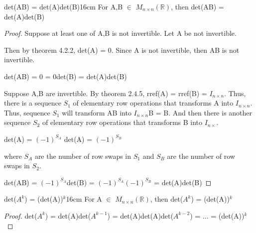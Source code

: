     \vspace{0.5cm}



    \begin{wtheorem}{det(AB) = det(A)det(B)}{16cm}
        For A,B $\in$ $M_{n \times n}(\mathbb{R})$, then
        det(AB) = det(A)det(B)
    \end{wtheorem}

    \begin{proof}
        Suppose at least one of A,B is not invertible.
        Let A be not invertible.

        Then by {\color{red} theorem 4.2.2}, det(A) = 0.
        Since A is not invertible, then AB is not invertible.

        \hspace{0.5cm}
        det(AB) = 0 = 0det(B) = det(A)det(B)

        Suppose A,B are invertible. By {\color{red} theorem 2.4.5},
        rref(A) = rref(B) = $I_{n \times n}$.
        Thus, there is a sequence $S_1$ of elementary row operations
        that transforms A into $I_{n \times n}$.
        Thus, sequence $S_1$ will transform AB into $I_{n \times n}$B = B.
        And then there is another sequence $S_2$
        of elementary row operations that transforms B into $I_{n \times}$.
    
        \hspace{0.5cm}
        det(A) = $(-1)^{S_A}$
        \hspace{1cm}
        det(A) = $(-1)^{S_B}$

        where $S_A$ are the number of row swaps in $S_1$
        and $S_B$ are the number of row swaps in $S_2$.

        \hspace{0.5cm}
        det(AB)
        = $(-1)^{S_A}$det(B)
        = $(-1)^{S_A} (-1)^{S_B}$
        = det(A)det(B)
    \end{proof}

    \vspace{0.5cm}



    \begin{corollary}{det($A^k$) = (det(A))$^k$}{16cm}
        For A $\in$ $M_{n \times n}(\mathbb{R})$,
        then det($A^k$) = (det(A))$^k$
    \end{corollary}

    \begin{proof}
        det($A^k$)
        = det(A)det($A^{k-1}$)
        = det(A)det(A)det($A^{k-2}$)
        = ...
        = (det(A))$^k$
    \end{proof}


